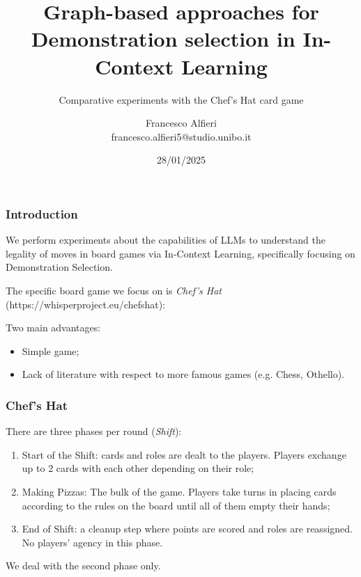 \documentclass{beamer}
\title[]{Graph-based approaches for Demonstration selection in In-Context
	Learning}
\subtitle{Comparative experiments with the Chef's Hat card game}
\author[]{Francesco Alfieri \\ francesco.alfieri5@studio.unibo.it}
\date{28/01/2025}
\theoremstyle{definition}
\theoremstyle{plain}
\theoremstyle{Remark}
\begin{document}
	
	\begin{frame}
		\titlepage
	\end{frame}
	
	\begin{frame}
		\frametitle{Introduction}
		
		We perform experiments about the capabilities of LLMs to understand the legality of moves in board games via In-Context Learning, specifically focusing on Demonstration Selection.
		
		\bigskip
		
		The specific board game we focus on  is \emph{Chef's Hat} (https://whisperproject.eu/chefshat):
		
		\bigskip
		\pause
		Two main advantages:\pause
		\begin{itemize}
			\item Simple game;\pause
			\item Lack of literature with respect to more famous games (e.g. Chess, Othello).
		\end{itemize}
		
	\end{frame}
	
	
	\begin{frame}
		
		\frametitle{Chef's Hat}
		\pause
		There are three phases per round (\emph{Shift}):
		\pause
		\begin{enumerate}
			\item Start of the Shift: cards and roles are dealt to the players. Players exchange up to 2 cards with each other depending on their role;\pause 
			\item Making Pizzas: The bulk of the game. Players take turns in placing cards according to the rules on the board until all of them empty their hands;\pause
			\item End of Shift: a cleanup step where points are scored and roles are reassigned. No players' agency in this phase.\pause
		\end{enumerate}\bigskip
		
		We deal with the second phase only.
		
	\end{frame}
	
	
\end{document}
